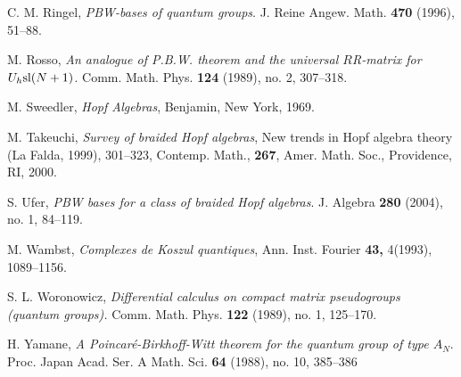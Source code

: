 \documentclass[english]{amsart}
\numberwithin{equation}{section}
\numberwithin{figure}{section}
\theoremstyle{plain}
\theoremstyle{definition}
\theoremstyle{definition}
\theoremstyle{remark}
\theoremstyle{remark}
\theoremstyle{plain}
\theoremstyle{plain}
\theoremstyle{plain}
\begin{document}
\begin{thebibliography}{}
 C. M. Ringel, \emph{PBW-bases of quantum groups}.
J. Reine Angew. Math. \textbf{470} (1996), 51--88.  

 M. Rosso, \emph{An analogue of P.B.W. theorem and the universal $R$R-matrix for $U_h{\rm sl}(N+1)$}. Comm. Math. Phys. \textbf{124} (1989), no. 2, 307--318. 

 M. Sweedler, \emph{Hopf Algebras}, Benjamin, New
York, 1969.

 M. Takeuchi, \emph{Survey of braided Hopf algebras},
New trends in Hopf algebra theory (La Falda, 1999), 301--323, Contemp. Math., \textbf{267}, Amer. Math. Soc., Providence, RI, 2000.

S. Ufer, \emph{PBW bases for a class of braided
Hopf algebras}. J. Algebra \textbf{280} (2004), no. 1, 84--119. 

 M. Wambst, \emph{Complexes de Koszul quantiques}, Ann.
Inst. Fourier \textbf{43,} 4(1993), 1089--1156.

 S. L. Woronowicz, \emph{Differential calculus on compact matrix pseudogroups (quantum groups).} Comm. Math. Phys. \textbf{122} (1989), no. 1, 125--170. 

 H. Yamane, \emph{A Poincaré-Birkhoff-Witt theorem for the quantum group of type $A_N$}. Proc. Japan Acad. Ser. A Math. Sci. \textbf{64} (1988), no. 10, 385--386

\end{thebibliography}
\end{document}

